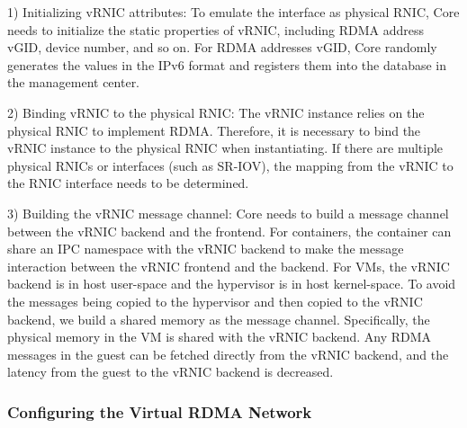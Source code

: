 
1) Initializing vRNIC attributes: To emulate the interface as physical RNIC, \sys Core needs to initialize the static properties of vRNIC, including RDMA address vGID, device number, and so on. For RDMA addresses vGID, \sys Core randomly generates the values in the IPv6 format and registers them into the database in the management center.


2) Binding vRNIC to the physical RNIC: The vRNIC instance relies on the physical RNIC to implement RDMA. Therefore, it is necessary to bind the vRNIC instance to the physical RNIC when instantiating. If there are multiple physical RNICs or interfaces (such as SR-IOV), the mapping from the vRNIC to the RNIC interface needs to be determined.


3) Building the vRNIC message channel: \sys Core needs to build a message channel between the vRNIC backend and the frontend. For containers, the container can share an IPC namespace with the vRNIC backend to make the message interaction between the vRNIC frontend and the backend. For VMs, the vRNIC backend is in host user-space and the hypervisor is in host kernel-space. To avoid the messages being copied to the hypervisor and then copied to the vRNIC backend, we build a shared memory as the message channel. Specifically, the physical memory in the VM is shared with the vRNIC backend. Any RDMA messages in the guest can be fetched directly from the vRNIC backend, and the latency from the guest to the vRNIC backend is decreased.

\subsubsection{Configuring the Virtual RDMA Network}

